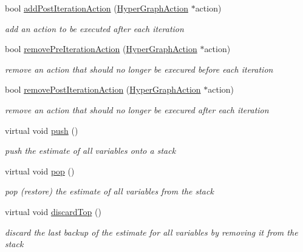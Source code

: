 \begin{DoxyCompactItemize}
bool \hyperlink{structg2o_1_1OptimizableGraph_a6db1ecbc582a7b79e1633eefc2109b26}{add\+Post\+Iteration\+Action} (\hyperlink{classg2o_1_1HyperGraphAction}{Hyper\+Graph\+Action} $\ast$action)
\begin{DoxyCompactList}\small\item\em add an action to be executed after each iteration \end{DoxyCompactList}\item 
bool \hyperlink{structg2o_1_1OptimizableGraph_a27f5ee7016b20bc6def24a2726fc824b}{remove\+Pre\+Iteration\+Action} (\hyperlink{classg2o_1_1HyperGraphAction}{Hyper\+Graph\+Action} $\ast$action)
\begin{DoxyCompactList}\small\item\em remove an action that should no longer be execured before each iteration \end{DoxyCompactList}\item 
bool \hyperlink{structg2o_1_1OptimizableGraph_a172f2f5c8ec5872d5bc34077c6391839}{remove\+Post\+Iteration\+Action} (\hyperlink{classg2o_1_1HyperGraphAction}{Hyper\+Graph\+Action} $\ast$action)
\begin{DoxyCompactList}\small\item\em remove an action that should no longer be execured after each iteration \end{DoxyCompactList}\item 
virtual void \hyperlink{structg2o_1_1OptimizableGraph_a3db385b25818a5659d1fa8407cb0db45}{push} ()
\begin{DoxyCompactList}\small\item\em push the estimate of all variables onto a stack \end{DoxyCompactList}\item 
virtual void \hyperlink{structg2o_1_1OptimizableGraph_a8487f537b16ac7a2ee416ea294a1e22e}{pop} ()
\begin{DoxyCompactList}\small\item\em pop (restore) the estimate of all variables from the stack \end{DoxyCompactList}\item 
virtual void \hyperlink{structg2o_1_1OptimizableGraph_a368b5f22dbc57abd2f651a20d039f61c}{discard\+Top} ()
\begin{DoxyCompactList}\small\item\em discard the last backup of the estimate for all variables by removing it from the stack \end{DoxyCompactList}\item 

\end{DoxyCompactItemize}
